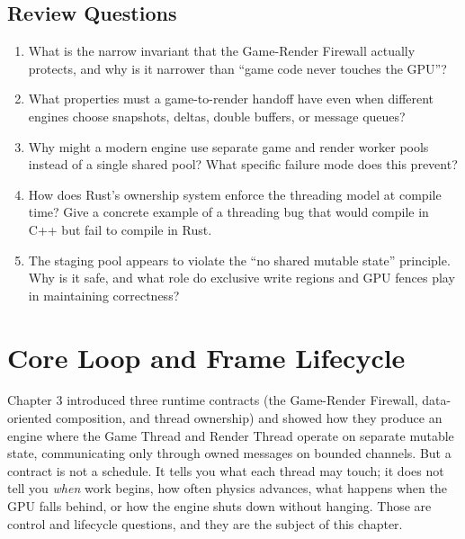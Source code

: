 \documentclass[
  11pt,
  letterpaper,
  DIV=11,
  numbers=noendperiod,
  twoside,
  open=right]{scrreprt}
\begin{document}
\section*{Review Questions}\label{review-questions-2}


\begin{enumerate}
\def\labelenumi{\arabic{enumi}.}
\item
  What is the narrow invariant that the Game-Render Firewall actually
  protects, and why is it narrower than ``game code never touches the
  GPU''?
\item
  What properties must a game-to-render handoff have even when different
  engines choose snapshots, deltas, double buffers, or message queues?
\item
  Why might a modern engine use separate game and render worker pools
  instead of a single shared pool? What specific failure mode does this
  prevent?
\item
  How does Rust's ownership system enforce the threading model at
  compile time? Give a concrete example of a threading bug that would
  compile in C++ but fail to compile in Rust.
\item
  The staging pool appears to violate the ``no shared mutable state''
  principle. Why is it safe, and what role do exclusive write regions
  and GPU fences play in maintaining correctness?
\end{enumerate}

\chapter{Core Loop and Frame
Lifecycle}\label{core-loop-and-frame-lifecycle}

Chapter 3 introduced three runtime contracts (the Game-Render Firewall,
data-oriented composition, and thread ownership) and showed how they
produce an engine where the Game Thread and Render Thread operate on
separate mutable state, communicating only through owned messages on
bounded channels. But a contract is not a schedule. It tells you what
each thread may touch; it does not tell you \emph{when} work begins, how
often physics advances, what happens when the GPU falls behind, or how
the engine shuts down without hanging. Those are control and lifecycle
questions, and they are the subject of this chapter.
\end{document}
